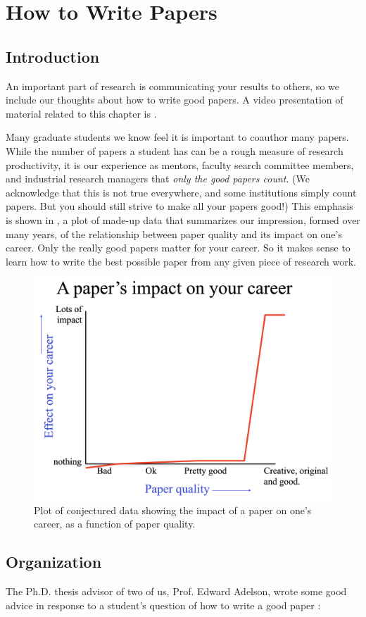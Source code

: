 
\chapter{How to Write Papers}
\label{chapter:how_to_write_papers}

\section{Introduction}
An important part of research is communicating your results to others, so we include our thoughts about how to write good papers.  A video presentation of material related to this chapter is \cite{FreemanPapers2020}.

Many graduate students we know feel it is important to coauthor many papers.  While the number of papers a student has can be a rough measure of research productivity, it is our experience as mentors, faculty search committee members, and industrial research managers that {\em only the good papers count}. (We acknowledge that this is not true everywhere, and some institutions simply count papers. But you should still strive to make all your papers good!)  This emphasis is shown in \fig{\ref{fig:impact}}, a plot of made-up data that summarizes our impression, formed over many years, of the relationship between paper quality and its impact on one's career.  Only the really good papers matter for your career.  So it makes sense to learn how to write the best possible paper from any given piece of research work.

\begin{figure}
\centerline{
\includegraphics[width=0.60\linewidth]{figures/papers/impact.jpg}}
\caption{Plot of conjectured data showing the impact of a paper on one's career, as a function of paper quality. }
\label{fig:impact}
\end{figure}


\section{Organization}
The Ph.D. thesis advisor of two of us, Prof. Edward Adelson, wrote some good advice in response to a student's question of how to write a good paper \cite{Adelson92}:

